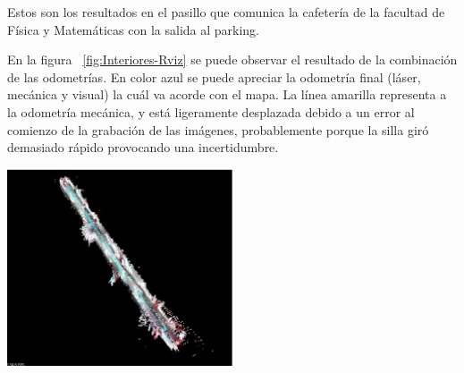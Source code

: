 Estos son los resultados en el pasillo que comunica la cafetería de la facultad
de Física y Matemáticas con la salida al parking.

En la figura ~\ref{fig:Interiores-Rviz} se puede observar el resultado de la
combinación de las odometrías. En color azul se puede apreciar la odometría
final (láser, mecánica y visual) la cuál va acorde con el mapa. La línea
amarilla representa a la odometría mecánica, y está ligeramente desplazada
debido a un error al comienzo de la grabación de las imágenes, probablemente
porque la silla giró demasiado rápido provocando una incertidumbre.


% 

\begin{minipage}{\linewidth}
    \centering
    \includegraphics[width=0.5\textwidth]{images/cap4/Interiores-rtabmap-lejos.eps}
    \label{fig:Interiores-Rtabmap-Lejos}
\end{minipage}

